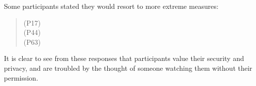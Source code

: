 \documentclass{sigchi}
\begin{document}
Some participants stated they would resort to more extreme measures:

\begin{quotation}
 (P17)\\

 (P44)\\

 (P63)

\end{quotation}

It is clear to see from these responses that participants value their security and privacy, and are troubled by the thought of someone watching them without their permission.




\end{document}
